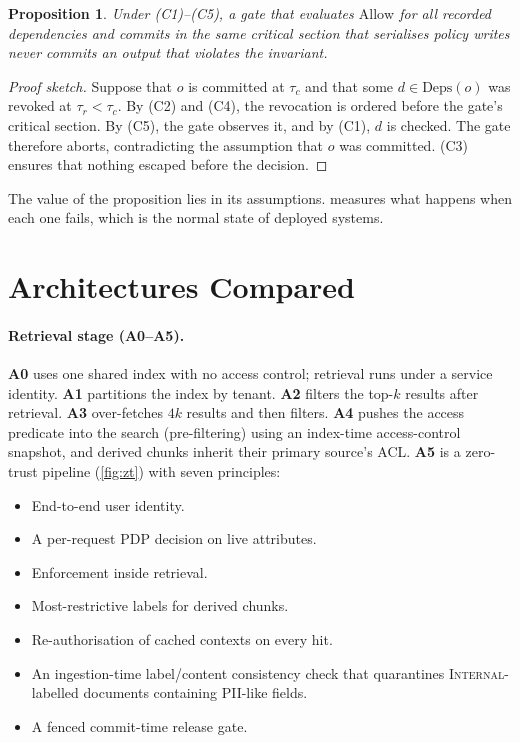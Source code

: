 \documentclass[10pt]{article}
\newtheorem{proposition}{Proposition}
\begin{document}
\begin{proposition}
Under (C1)--(C5), a gate that evaluates $\mathrm{Allow}$ for all recorded dependencies and commits in the same critical section that serialises policy writes never commits an output that violates the invariant.
\end{proposition}
\begin{proof}[Proof sketch]
Suppose that $o$ is committed at $\tau_c$ and that some $d\in\mathrm{Deps}(o)$ was revoked at $\tau_r<\tau_c$. By (C2) and (C4), the revocation is ordered before the gate's critical section. By (C5), the gate observes it, and by (C1), $d$ is checked. The gate therefore aborts, contradicting the assumption that $o$ was committed. (C3) ensures that nothing escaped before the decision.
\end{proof}
The value of the proposition lies in its assumptions.  measures what happens when each one fails, which is the normal state of deployed systems.

\section{Architectures Compared}
\label{sec:arch}
\paragraph{Retrieval stage (A0--A5).}
\textbf{A0} uses one shared index with no access control; retrieval runs under a service identity. \textbf{A1} partitions the index by tenant. \textbf{A2} filters the top-$k$ results after retrieval. \textbf{A3} over-fetches $4k$ results and then filters. \textbf{A4} pushes the access predicate into the search (pre-filtering) using an index-time access-control snapshot, and derived chunks inherit their primary source's ACL. \textbf{A5} is a zero-trust pipeline (\cref{fig:zt}) with seven principles:
\begin{itemize}\itemsep0pt
\item[P1] End-to-end user identity.
\item[P2] A per-request PDP decision on live attributes.
\item[P3] Enforcement inside retrieval.
\item[P4] Most-restrictive labels for derived chunks.
\item[P5] Re-authorisation of cached contexts on every hit.
\item[P6] An ingestion-time label/content consistency check that quarantines \textsc{Internal}-labelled documents containing PII-like fields.
\item[P7] A fenced commit-time release gate.
\end{itemize}
\end{document}
